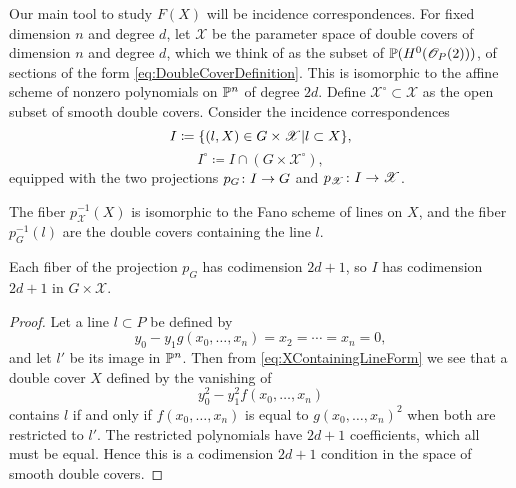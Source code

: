 Our main tool to study $F(X)$ will be incidence correspondences. For fixed dimension $n$ and degree $d$, let $\mathscr{X}$ be the parameter space of double covers of dimension $n$ and degree $d$, which we think of as the subset of $\P(H^0(\sO_P(2)))$, of sections of the form \cref{eq:DoubleCoverDefinition}. This is isomorphic to the affine scheme of nonzero polynomials on $\P^n$ of degree $2d$.  Define $\mathscr{X}^\circ \subset \mathscr{X}$ as the open subset of smooth double covers. Consider the incidence correspondences
\begin{equation}
  \label{eq:IDefinition}
  I \coloneqq \set{(l,X) \in G \times \mathscr{X} \vert l \subset X},
\end{equation}
\begin{equation}
  \label{eq:ICircDefinition}
  I^\circ \coloneqq I \cap (G \times \mathscr{X}^\circ),
\end{equation}
equipped with the two projections $p_G \from I \to G$ and $p_{\mathscr{X}}\from I \to \mathscr{X}$.

\begin{observation}
The fiber $p_{\mathscr{X}}^{-1}(X)$ is isomorphic to the Fano scheme of lines on $X$, and the fiber $p_{G}^{-1}(l)$ are the double covers containing the line $l$.
\end{observation}

\begin{lemma}
  \label{lem:FiberCodimension}
  Each fiber of the projection $p_G$ has codimension $2d+1$, so $I$ has codimension $2d+1$ in $G \times \mathscr{X}$.
\end{lemma}
\begin{proof}
  Let a line $l \subset P$ be defined by
\[y_0 - y_1g(x_0,\dots,x_n) = x_2 = \cdots = x_n = 0,\]
and let $l'$ be its image in $\P^n$. Then from \cref{eq:XContainingLineForm} we see that a double cover $X$ defined by the vanishing of
\[y_0^2 - y_1^2f(x_0,\dots,x_n) \]
contains $l$ if and only if $f(x_0,\dots,x_n)$ is equal to $g(x_0,\dots,x_n)^2$ when both are restricted to $l'$. The restricted polynomials have $2d+1$ coefficients, which all must be equal. Hence this is a codimension $2d+1$ condition in the space of smooth double covers.
\end{proof}

